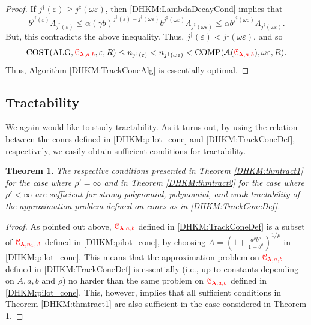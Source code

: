 \documentclass[USenglish]{article}
\theoremstyle{dgthm}
\newtheorem{theorem}{Theorem}
\theoremstyle{dgthm}
\theoremstyle{dgthm}
\theoremstyle{dgthm}
\theoremstyle{dgdef}
\theoremstyle{definition}
\DeclareMathOperator{\ALG}{ALG}
\DeclareMathOperator{\COST}{COST}
\DeclareMathOperator{\COMP}{COMP}
\newcommand{\DHKMchange}[1]{{\color{red}{#1}}}
\begin{document}
\begin{proof}
If $j^{\dagger}(\varepsilon) \ge j^{\ddagger}(\omega \varepsilon)$, then \eqref{DHKM:LambdaDecayCond} implies that 
\[
 b^{j^\dagger(\varepsilon)} \Lambda_{j^\dagger(\varepsilon) } \le \alpha (\gamma b)^{j^{\dagger}(\varepsilon) - j^{\ddagger}(\omega \varepsilon)} b^{j^{\ddagger}(\omega \varepsilon) } \Lambda_{j^\ddagger(\omega \varepsilon) } \le \alpha b^{j^{\ddagger}(\omega \varepsilon) } \Lambda_{j^\ddagger(\omega \varepsilon) }.
\]
But, this contradicts the above inequality.  Thus, $j^\dagger(\varepsilon) < j^\ddagger(\omega \varepsilon)$, and so
\[
\COST(\ALG,\DHKMchange{\calC_{\boldsymbol{\lambda},a,b}},\varepsilon,R) \le n_{j^\dagger(\varepsilon)} < n_{j^\ddagger(\omega \varepsilon)} < \COMP(\calA(\DHKMchange{\calC_{\boldsymbol{\lambda},a,b}}),\omega \varepsilon,R).
\]
Thus,  Algorithm \ref{DHKM:TrackConeAlg} is essentially optimal.
\end{proof}


\subsection{Tractability}\label{DHKM:SecDecayTract}



We again would like to study tractability. As it turns out, by using the relation 
between the cones defined in \eqref{DHKM:pilot_cone} and \eqref{DHKM:TrackConeDef}, respectively, we 
easily obtain sufficient conditions for tractability. 

\begin{theorem} \label{DHKM:thmtract3}
The respective conditions presented in Theorem \ref{DHKM:thmtract1} for the case where $\rho'=\infty$ and 
in Theorem \ref{DHKM:thmtract2} for the case where $\rho'<\infty$ are sufficient for strong polynomial, polynomial, and weak tractability of the approximation problem defined on cones as in \eqref{DHKM:TrackConeDef}.
\end{theorem}
\begin{proof}
As pointed out above, $\DHKMchange{\calC_{\boldsymbol{\lambda},a,b}}$ defined in \eqref{DHKM:TrackConeDef} is a subset of  $\DHKMchange{\calC_{\boldsymbol{\lambda},n_1,A}}$ defined in \eqref{DHKM:pilot_cone}, by choosing $A=\left(1 + \frac{a^\rho b^\rho}{1 - b^\rho} \right)^{1/\rho}$ in \eqref{DHKM:pilot_cone}. This means that the approximation problem on  $\DHKMchange{\calC_{\boldsymbol{\lambda},a,b}}$ defined in \eqref{DHKM:TrackConeDef} is essentially (i.e., up to constants depending on $A,a,b$ and $\rho$) no harder than the same problem on $\DHKMchange{\calC_{\boldsymbol{\lambda},a,b}}$ defined in \eqref{DHKM:pilot_cone}. This, however, implies that all sufficient conditions in Theorem \ref{DHKM:thmtract1} are also sufficient in the case considered in Theorem \ref{DHKM:thmtract3}.
\end{proof}
\end{document}

